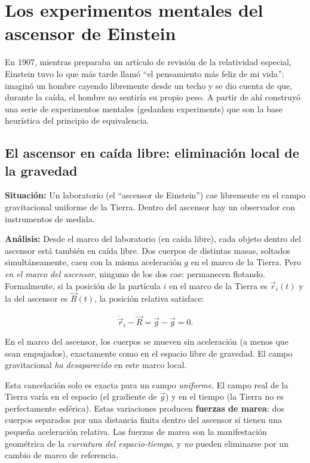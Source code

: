 \section{Los experimentos mentales del ascensor de Einstein}
\label{sec:ascensor}

En 1907, mientras preparaba un artículo de revisión de la relatividad especial, Einstein tuvo lo que más tarde llamó ``el pensamiento más feliz de mi vida'': imaginó un hombre cayendo libremente desde un techo y se dio cuenta de que, durante la caída, el hombre no sentiría su propio peso. A partir de ahí construyó una serie de experimentos mentales (gedanken experiments) que son la base heurística del principio de equivalencia.

\subsection{El ascensor en caída libre: eliminación local de la gravedad}

\textbf{Situación:} Un laboratorio (el ``ascensor de Einstein'') cae libremente en el campo gravitacional uniforme de la Tierra. Dentro del ascensor hay un observador con instrumentos de medida.

\textbf{Análisis:} Desde el marco del laboratorio (en caída libre), cada objeto dentro del ascensor está también en caída libre. Dos cuerpos de distintas masas, soltados simultáneamente, caen con la misma aceleración $g$ en el marco de la Tierra. Pero \emph{en el marco del ascensor}, ninguno de los dos cae: permanecen flotando. Formalmente, si la posición de la partícula $i$ en el marco de la Tierra es $\vec{r}_i(t)$ y la del ascensor es $\vec{R}(t)$, la posición relativa satisface:

\begin{equation}
  \ddot{\vec{r}}_i - \ddot{\vec{R}} = \vec{g} - \vec{g} = 0.
  \label{eq:caida_libre_rel}
\end{equation}

En el marco del ascensor, los cuerpos se mueven sin aceleración (a menos que sean empujados), exactamente como en el espacio libre de gravedad. El campo gravitacional \emph{ha desaparecido} en este marco local.

\begin{importante}
Esta cancelación solo es exacta para un campo \emph{uniforme}. El campo real de la Tierra varía en el espacio (el gradiente de $\vec{g}$) y en el tiempo (la Tierra no es perfectamente esférica). Estas variaciones producen \textbf{fuerzas de marea}: dos cuerpos separados por una distancia finita dentro del ascensor sí tienen una pequeña aceleración relativa. Las fuerzas de marea son la manifestación geométrica de la \emph{curvatura del espacio-tiempo}, y \emph{no} pueden eliminarse por un cambio de marco de referencia.
\end{importante}

